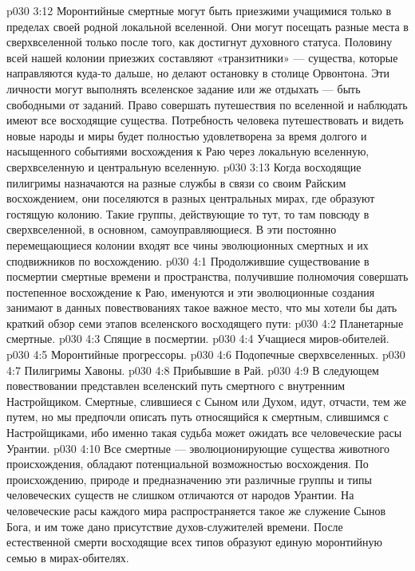 \vs p030 3:12 Моронтийные смертные могут быть приезжими учащимися только в пределах своей родной локальной вселенной. Они могут посещать разные места в сверхвселенной только после того, как достигнут духовного статуса. Половину всей нашей колонии приезжих составляют «транзитники» --- существа, которые направляются куда\hyp{}то дальше, но делают остановку в столице Орвонтона. Эти личности могут выполнять вселенское задание или же отдыхать --- быть свободными от заданий. Право совершать путешествия по вселенной и наблюдать имеют все восходящие существа. Потребность человека путешествовать и видеть новые народы и миры будет полностью удовлетворена за время долгого и насыщенного событиями восхождения к Раю через локальную вселенную, сверхвселенную и центральную вселенную.
\vs p030 3:13 \pc {}\bibnobreakspace {} Когда восходящие пилигримы назначаются на разные службы в связи со своим Райским восхождением, они поселяются в разных центральных мирах, где образуют гостящую колонию. Такие группы, действующие то тут, то там повсюду в сверхвселенной, в основном, самоуправляющиеся. В эти постоянно перемещающиеся колонии входят все чины эволюционных смертных и их сподвижников по восхождению.
\vs p030 4:1 Продолжившие существование в посмертии смертные времени и пространства, получившие полномочия совершать постепенное восхождение к Раю, именуются  и эти эволюционные создания занимают в данных повествованиях такое важное место, что мы хотели бы дать краткий обзор семи этапов вселенского восходящего пути:
\vs p030 4:2 \bibnobreakspace Планетарные смертные.
\vs p030 4:3 \bibnobreakspace Спящие в посмертии.
\vs p030 4:4 \bibnobreakspace Учащиеся миров\hyp{}обителей.
\vs p030 4:5 \bibnobreakspace Моронтийные прогрессоры.
\vs p030 4:6 \bibnobreakspace Подопечные сверхвселенных.
\vs p030 4:7 \bibnobreakspace Пилигримы Хавоны.
\vs p030 4:8 \bibnobreakspace Прибывшие в Рай.
\vs p030 4:9 \pc В следующем повествовании представлен вселенский путь смертного с внутренним Настройщиком. Смертные, слившиеся с Сыном или Духом, идут, отчасти, тем же путем, но мы предпочли описать путь относящийся к смертным, слившимся с Настройщиками, ибо именно такая судьба может ожидать все человеческие расы Урантии.
\vs p030 4:10 \pc {}\bibnobreakspace {} Все смертные --- эволюционирующие существа животного происхождения, обладают потенциальной возможностью восхождения. По происхождению, природе и предназначению эти различные группы и типы человеческих существ не слишком отличаются от народов Урантии. На человеческие расы каждого мира распространяется такое же служение Сынов Бога, и им тоже дано присутствие духов\hyp{}служителей времени. После естественной смерти восходящие всех типов образуют единую моронтийную семью в мирах\hyp{}обителях.
